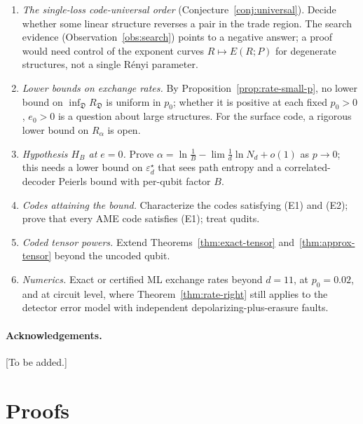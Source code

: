\documentclass[11pt,a4paper]{article}
\theoremstyle{plain}
\theoremstyle{definition}
\theoremstyle{remark}
\newcommand{\err}{\varepsilon^{\star}}
\begin{document}
\begin{enumerate}[leftmargin=2em]
\item \emph{The single-loss code-universal order} (Conjecture~\ref{conj:universal}). Decide whether some linear structure reverses a pair in the trade region. The search evidence (Observation~\ref{obs:search}) points to a negative answer; a proof would need control of the exponent curves $R\mapsto E(R;P)$ for degenerate structures, not a single R\'enyi parameter.
\item \emph{Lower bounds on exchange rates.} By Proposition~\ref{prop:rate-small-p}, no lower bound on $\inf_{\mathfrak D}R_{\mathfrak D}$ is uniform in $p_0$; whether it is positive at each fixed $p_0>0$, $e_0>0$ is a question about large structures. For the surface code, a rigorous lower bound on $R_\alpha$ is open.
\item \emph{Hypothesis $H_B$ at $e=0$.} Prove $\alpha=\ln\frac1B-\lim\frac1d\ln N_d+o(1)$ as $p\to0$; this needs a lower bound on $\err_d$ that sees path entropy and a correlated-decoder Peierls bound with per-qubit factor $B$.
\item \emph{Codes attaining the bound.} Characterize the codes satisfying (E1) and (E2); prove that every AME code satisfies (E1); treat qudits.
\item \emph{Coded tensor powers.} Extend Theorems~\ref{thm:exact-tensor} and~\ref{thm:approx-tensor} beyond the uncoded qubit.
\item \emph{Numerics.} Exact or certified ML exchange rates beyond $d=11$, at $p_0=0.02$, and at circuit level, where Theorem~\ref{thm:rate-right} still applies to the detector error model with independent depolarizing-plus-erasure faults.
\end{enumerate}

\paragraph{Acknowledgements.} [To be added.]

\appendix

\section{Proofs}\label{app:proofs}
\end{document}
